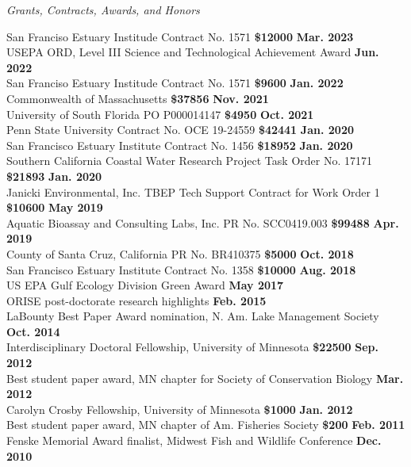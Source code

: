 \documentclass[letterpaper,12pt]{article}
\newcommand{\sectitle}[1]{\vspace{\baselineskip} \centerline{\large{\textit{#1}}}}
\begin{document}
\sectitle{Grants, Contracts, Awards, and Honors}

San Franciso Estuary Institude Contract No. 1571 {\bf \$12000} \hfill {\bf Mar. 2023} \\
USEPA ORD, Level III Science and Technological Achievement Award \hfill {\bf Jun. 2022} \\
San Franciso Estuary Institude Contract No. 1571 {\bf \$9600} \hfill {\bf Jan. 2022} \\
Commonwealth of Massachusetts {\bf \$37856} \hfill {\bf Nov. 2021} \\
University of South Florida PO P000014147 {\bf \$4950} \hfill {\bf Oct. 2021} \\
Penn State University Contract No. OCE 19-24559 {\bf \$42441} \hfill {\bf Jan. 2020} \\
San Francisco Estuary Institute Contract No. 1456 {\bf \$18952} \hfill {\bf Jan. 2020} \\
Southern California Coastal Water Research Project Task Order No. 17171 {\bf \$21893} \hfill {\bf Jan. 2020} \\
Janicki Environmental, Inc. TBEP Tech Support Contract for Work Order 1 {\bf \$10600} \hfill {\bf May 2019} \\
Aquatic Bioassay and Consulting Labs, Inc. PR No. SCC0419.003 {\bf \$99488} \hfill {\bf Apr. 2019} \\
County of Santa Cruz, California PR No. BR410375 {\bf \$5000} \hfill {\bf Oct. 2018} \\
San Francisco Estuary Institute Contract No. 1358 {\bf \$10000} \hfill {\bf Aug. 2018} \\
US EPA Gulf Ecology Division Green Award \hfill {\bf May 2017} \\
ORISE post-doctorate research highlights \hfill {\bf Feb. 2015} \\
LaBounty Best Paper Award nomination, N. Am. Lake Management Society \hfill {\bf Oct. 2014} \\
Interdisciplinary Doctoral Fellowship, University of Minnesota {\bf \$22500} \hfill {\bf Sep. 2012} \\
Best student paper award, MN chapter for Society of Conservation Biology \hfill {\bf Mar. 2012} \\
Carolyn Crosby Fellowship, University of Minnesota {\bf \$1000} \hfill {\bf Jan. 2012} \\
Best student paper award, MN chapter of Am. Fisheries Society {\bf \$200} \hfill {\bf Feb. 2011} \\
Fenske Memorial Award finalist, Midwest Fish and Wildlife Conference \hfill {\bf Dec. 2010} \\
\end{document}
